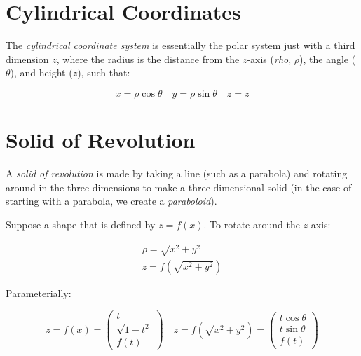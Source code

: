 \documentclass[00_complete]{subfiles}
\begin{document}
\section{Cylindrical Coordinates}

The \emph{cylindrical coordinate system} is essentially the polar system just with a
third dimension $z$, where the radius is the distance from the $z$-axis
(\emph{rho}, $\rho$), the angle ($\theta$), and height ($z$), such that:

$$x = \rho \cos \theta \quad y = \rho \sin \theta \quad z = z$$

\section{Solid of Revolution}

A \emph{solid of revolution} is made by taking a line (such as a parabola) and rotating
around in the three dimensions to make a three-dimensional solid (in the case of
starting with a parabola, we create a \emph{paraboloid}).

Suppose a shape that is defined by $z=f(x)$. To rotate around the $z$-axis:

$$
\begin{gathered}
    \rho=\sqrt{x^2+y^2} \\
    z=f\left(\sqrt{x^2+y^2}\right)
\end{gathered}
$$

Parameterially:

$$z=f(x) = \begin{pmatrix}
    t \\ \sqrt{1-t^2} \\ f(t)
\end{pmatrix}
\quad
z=f\left(\sqrt{x^2+y^2}\right) = \begin{pmatrix}
    t \cos \theta \\ t \sin \theta \\ f(t)
\end{pmatrix}$$
\end{document}
